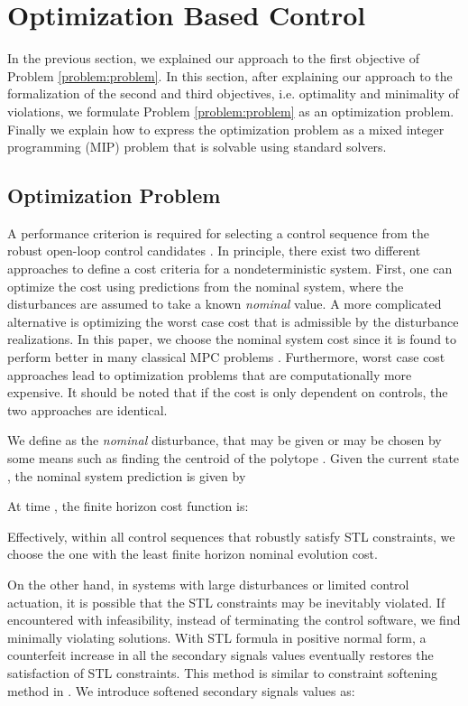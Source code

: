\documentclass[letterpaper, 10 pt, conference]{ieeeconf}
\begin{document}
\section{Optimization Based Control}
\label{sec:optimization}

In the previous section, we explained our approach to the first objective of Problem \ref{problem:problem}. In this section, after explaining our approach to the formalization of the second and third objectives, i.e. optimality and minimality of violations, we formulate Problem \ref{problem:problem} as an optimization problem. Finally we explain how to express the optimization problem as a mixed integer programming (MIP) problem that is solvable using standard solvers. 





\subsection{Optimization Problem}
A performance criterion is required for selecting a control sequence from the robust open-loop control candidates . In principle, there exist two different approaches to define a cost criteria for a nondeterministic system. First, one can optimize the cost using predictions from the nominal system, where the disturbances are assumed to take a known \emph{nominal} value. A more complicated alternative is optimizing the worst case cost that is admissible by the disturbance realizations. In this paper, we choose the nominal system cost since it is found to perform better in many classical MPC problems \cite{bemporad1999robust}. Furthermore, worst case cost approaches lead to optimization problems that are computationally more expensive. It should be noted that if the cost is only dependent on controls, the two approaches are identical.  


We define  as the \emph{nominal} disturbance, that may be given or may be chosen by some means such as finding the centroid of the polytope . Given the current state , the nominal system prediction is given by 

At time , the finite horizon cost function is:

Effectively, within all control sequences that robustly satisfy STL constraints, we choose the one with the least finite horizon nominal evolution cost. 

On the other hand, in systems with large disturbances or limited control actuation, it is possible that the STL constraints may be inevitably violated. 
If encountered with infeasibility, instead of terminating the control software, we find minimally violating solutions. With STL formula  in positive normal form, a counterfeit increase in all the secondary signals values eventually restores the satisfaction of STL constraints. This method is similar to constraint softening method in \cite{kerrigan2000soft}. We introduce softened secondary signals values as:
\end{document}
